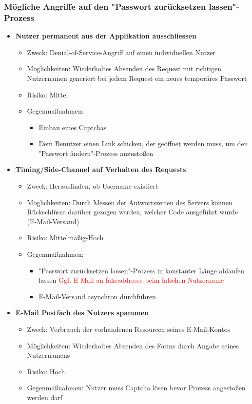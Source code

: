 \documentclass[12pt,DIV14,BCOR10mm,a4paper,twoside,parskip=half-,headsepline,headinclude,english,ngerman,bibliography=totocnumbered]{scrreprt}
\begin{document}
\subsubsection{Mögliche Angriffe auf den "Passwort zurücksetzen lassen"-Prozess}

\begin{itemize}
  \item \textbf{Nutzer permanent aus der Applikation ausschliessen}
  \begin{itemize}
  \item Zweck: Denial-of-Service-Angriff auf einen individuellen Nutzer
  \item Möglichkeiten: Wiederholtes Absenden des Request mit richtigen Nutzernamen generiert bei jedem Request ein neues temporäres Passwort
  \item Risiko: Mittel
  \item Gegenmaßnahmen: 
  \begin{itemize}
  \item Einbau eines Captchas
  \item Dem Benutzer einen Link schicken, der geöffnet werden muss, um den "Passwort ändern"-Prozess anzustoßen
  \end{itemize}
\end{itemize}

  \item \textbf{Timing/Side-Channel auf Verhalten des Requests}
  \begin{itemize}
  \item Zweck: Herausfinden, ob Username existiert
  \item Möglichkeiten: Durch Messen der Antwortszeiten des Servers können Rückschlüsse darüber gezogen werden, welcher Code ausgeführt wurde (E-Mail-Versand)
  \item Risiko: Mittelmäßig-Hoch
  \item Gegenmaßnahmen: 
  \begin{itemize}
    \item "Passwort zurücksetzen lassen"-Prozess in konstanter Länge ablaufen lassen \textcolor{red}{Ggf. E-Mail an fakeaddresse beim falschen Nutzername}
    \item E-Mail-Versand asynchron durchführen
    \end{itemize}
  \end{itemize}

  \item \textbf{E-Mail Postfach des Nutzers spammen}
  \begin{itemize}
  \item Zweck: Verbrauch der vorhandenen Resourcen seines E-Mail-Kontos
  \item Möglichkeiten: Wiederholtes Absenden des Forms durch Angabe seines Nutzernamens
  \item Risiko: Hoch
  \item Gegenmaßnahmen: Nutzer muss Captcha lösen bevor Prozess angestoßen werden darf
  \end{itemize}
\end{itemize}
\end{document}
